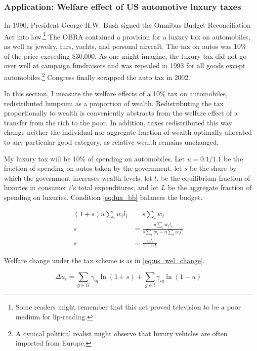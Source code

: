 \subsubsection{Application: Welfare effect of US automotive luxury taxes}

In 1990, President George H.W. Bush signed the Omnibus Budget Reconciliation Act into law.\footnote{Some readers might remember that this act proved television to be a poor medium for lip-reading.}  The OBRA contained a provision for a luxury tax on automobiles, as well as jewelry, furs, yachts, and personal aircraft.  The tax on autos was 10\% of the price exceeding \$30,000.  As one might imagine, the luxury tax did not go over well at campaign fundraisers and was repealed in 1993 for all goods except automobiles.\footnote{A cynical political realist might observe that luxury vehicles are often imported from Europe.}  Congress finally scrapped the auto tax in 2002.

In this section, I measure the welfare effects of a 10\% tax on automobiles, redistributed lumpsum as a proportion of wealth.  Redistributing the tax proportionally to wealth is conveniently abstracts from the welfare effect of a transfer from the rich to the poor.  In addition, taxes redistributed this way change neither the individual nor aggregate fraction of wealth optimally allocated to any particular good category, as relative wealth remains unchanged.

My luxury tax will be 10\% of spending on automobiles.  Let $u = 0.1 / 1.1$ be the fraction of spending on autos taken by the government, let $s$ be the share by which the government increases wealth levels, let $l_i$ be the equilibrium fraction of luxuries in consumer $i$'s total expenditures, and let $L$ be the aggregate fraction of spending on luxuries.  Condition \eqref{eq:lux_bb} balances the budget.

\begin{align}
    (1 + s) u \sum_i w_i l_i &= s \sum_i w_i \nonumber \\
    s &= \frac{u \sum_i w_i l_i}{s \sum_i w_i - u \sum_i w_i l_i} \nonumber \\
    \label{eq:lux_bb}
    s &= \frac{u L}{1 - uL}
\end{align}

Welfare change under the tax scheme is as in \eqref{eq:us_wel_change}.

\begin{equation}
    \label{eq:us_wel_change}
    \Delta u_i = \sum_{g\in G} \gamma_{ig} \ln(1 + s) + \sum_{g\in l} \gamma_{ig} \ln (1 - u)
\end{equation}

